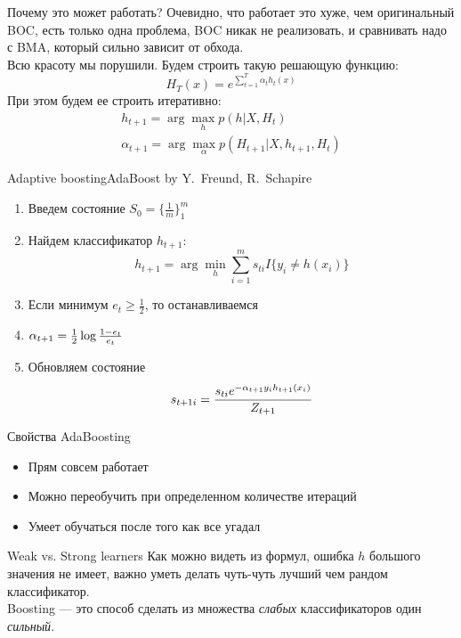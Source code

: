 \documentclass[14pt, fleqn, xcolor={dvipsnames, table}]{beamer}
\begin{document}
\begin{frame}{Почему это может работать?}
\small
Очевидно, что работает это хуже, чем оригинальный BOC, есть только одна проблема, BOC никак не реализовать, и сравнивать надо с BMA, который сильно зависит от обхода. \\
Всю красоту мы порушили. Будем строить такую решающую функцию:
$$
H_T(x) = e^{\sum_{t=1}^T \alpha_t h_t(x)}
$$
При этом будем ее строить итеративно:
$$\begin{array}{l}
h_{t+1} = \arg \max_{h} p(h | X,H_t) \\
\alpha_{t+1} = \arg \max_{\alpha} p(H_{t+1} | X, h_{t+1}, H_t)
\end{array}$$
\end{frame}

\begin{frame}{Adaptive boosting}{AdaBoost by Y.~Freund, R.~Schapire}
\begin{enumerate}
  \item Введем состояние $S_0 = \{\frac{1}{m}\}_1^m$
  \item Найдем классификатор $h_{t+1}$:
  $$h_{t+1} = \arg \min_h \sum_{i=1}^m s_{ti} I\{y_i \ne h(x_i)\} $$
  \item Если минимум $e_t \ge \frac{1}{2}$, то останавливаемся
  \item $\alpha_{t+1} = \frac{1}{2}\log{1 - e_t \over e_t}$
  \item Обновляем состояние
  $$s_{t+1i} = {s_{ti} e^{-\alpha_{t+1} y_i h_{t+1}(x_i)} \over Z_{t+1}}$$
\end{enumerate}
\end{frame}

\begin{frame}{Свойства AdaBoosting}{}
\begin{itemize}
  \item Прям совсем работает
  \item Можно переобучить при определенном количестве итераций
  \item Умеет обучаться после того как все угадал
\end{itemize}
\end{frame}

\begin{frame}{Weak vs. Strong learners}
Как можно видеть из формул, ошибка $h$ большого значения не имеет, важно уметь делать чуть-чуть лучший чем рандом классификатор.\\
Boosting --- это способ сделать из множества \textit{слабых} классификаторов один \textit{сильный}.
\end{frame}
\end{document}
